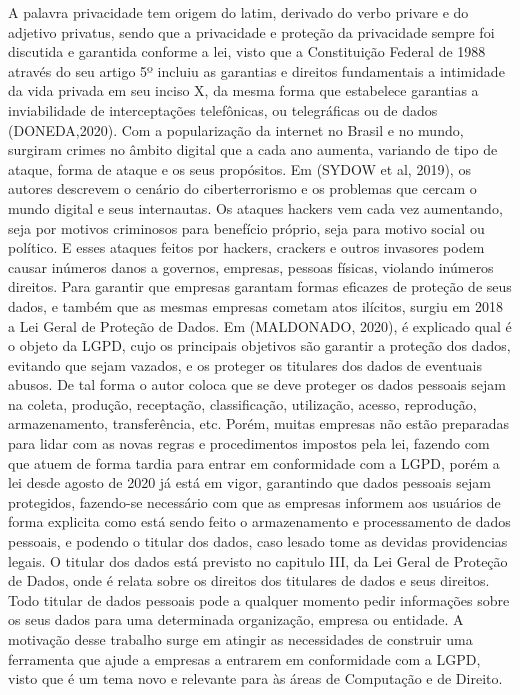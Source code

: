 \documentclass[
	12pt,				%
	openright,			%
	oneside,			%
	a4paper,			%
	english,			%
	french,				%
	spanish,			%
	brazil,				%
	]{abntex2}
\begin{document}
A palavra privacidade tem origem do latim, derivado do verbo privare e do adjetivo privatus, sendo que a privacidade e proteção da privacidade sempre foi discutida e garantida conforme a lei, visto que a Constituição Federal de 1988 através do seu artigo 5º incluiu as garantias e direitos fundamentais a intimidade da vida privada em seu inciso X, da mesma forma que estabelece garantias a inviabilidade de interceptações telefônicas, ou telegráficas ou de dados (DONEDA,2020). 
Com a popularização da internet no Brasil e no mundo, surgiram crimes no âmbito digital que a cada ano aumenta, variando de tipo de ataque, forma de ataque e os seus propósitos. Em (SYDOW et al, 2019), os autores descrevem o cenário do ciberterrorismo e os problemas que cercam o mundo digital e seus internautas. Os ataques hackers vem cada vez aumentando, seja por motivos criminosos para benefício próprio, seja para motivo social ou político.
E esses ataques feitos por hackers, crackers e outros invasores podem causar inúmeros danos a governos, empresas, pessoas físicas, violando inúmeros direitos.
Para garantir que empresas garantam formas eficazes de proteção de seus dados, e também que as mesmas empresas cometam atos ilícitos, surgiu em 2018 a Lei Geral de Proteção de Dados.
Em (MALDONADO, 2020), é explicado qual é o objeto da LGPD, cujo os principais objetivos são garantir a proteção dos dados, evitando que sejam vazados, e os proteger os titulares dos dados de eventuais abusos. De tal forma o autor coloca que se deve proteger os dados pessoais sejam na coleta, produção, receptação, classificação, utilização, acesso, reprodução, armazenamento, transferência, etc.
Porém, muitas empresas não estão preparadas para lidar com as novas regras e procedimentos impostos pela lei, fazendo com que atuem de forma tardia para entrar em conformidade com a LGPD, porém a lei desde agosto de 2020 já está em vigor, garantindo que dados pessoais sejam protegidos, fazendo-se necessário com que as empresas informem aos usuários de forma explicita como está sendo feito o armazenamento e processamento de dados pessoais, e podendo o titular dos dados, caso lesado tome as devidas providencias legais.
O titular dos dados está previsto no capitulo III, da Lei Geral de Proteção de Dados, onde é relata sobre os direitos dos titulares de dados e seus direitos. Todo titular de dados pessoais pode a qualquer momento pedir informações sobre os seus dados para uma determinada organização, empresa ou entidade. 
A motivação desse trabalho surge em atingir as necessidades de construir uma ferramenta que ajude a empresas a entrarem em conformidade com a LGPD, visto que é um tema novo e relevante para às áreas de Computação e de Direito.
\end{document}
